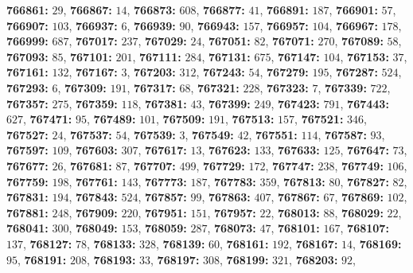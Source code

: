 \textsf{\bfseries 766861:} $29$, \textsf{\bfseries 766867:} $14$, \textsf{\bfseries 766873:} $608$, \textsf{\bfseries 766877:} $41$, \textsf{\bfseries 766891:} $187$, \textsf{\bfseries 766901:} $57$, \textsf{\bfseries 766907:} $103$, \textsf{\bfseries 766937:} $6$, \textsf{\bfseries 766939:} $90$, \textsf{\bfseries 766943:} $157$, \textsf{\bfseries 766957:} $104$, \textsf{\bfseries 766967:} $178$, \textsf{\bfseries 766999:} $687$, \textsf{\bfseries 767017:} $237$, \textsf{\bfseries 767029:} $24$, \textsf{\bfseries 767051:} $82$, \textsf{\bfseries 767071:} $270$, \textsf{\bfseries 767089:} $58$, \textsf{\bfseries 767093:} $85$, \textsf{\bfseries 767101:} $201$, \textsf{\bfseries 767111:} $284$, \textsf{\bfseries 767131:} $675$, \textsf{\bfseries 767147:} $104$, \textsf{\bfseries 767153:} $37$, \textsf{\bfseries 767161:} $132$, \textsf{\bfseries 767167:} $3$, \textsf{\bfseries 767203:} $312$, \textsf{\bfseries 767243:} $54$, \textsf{\bfseries 767279:} $195$, \textsf{\bfseries 767287:} $524$, \textsf{\bfseries 767293:} $6$, \textsf{\bfseries 767309:} $191$, \textsf{\bfseries 767317:} $68$, \textsf{\bfseries 767321:} $228$, \textsf{\bfseries 767323:} $7$, \textsf{\bfseries 767339:} $722$, \textsf{\bfseries 767357:} $275$, \textsf{\bfseries 767359:} $118$, \textsf{\bfseries 767381:} $43$, \textsf{\bfseries 767399:} $249$, \textsf{\bfseries 767423:} $791$, \textsf{\bfseries 767443:} $627$, \textsf{\bfseries 767471:} $95$, \textsf{\bfseries 767489:} $101$, \textsf{\bfseries 767509:} $191$, \textsf{\bfseries 767513:} $157$, \textsf{\bfseries 767521:} $346$, \textsf{\bfseries 767527:} $24$, \textsf{\bfseries 767537:} $54$, \textsf{\bfseries 767539:} $3$, \textsf{\bfseries 767549:} $42$, \textsf{\bfseries 767551:} $114$, \textsf{\bfseries 767587:} $93$, \textsf{\bfseries 767597:} $109$, \textsf{\bfseries 767603:} $307$, \textsf{\bfseries 767617:} $13$, \textsf{\bfseries 767623:} $133$, \textsf{\bfseries 767633:} $125$, \textsf{\bfseries 767647:} $73$, \textsf{\bfseries 767677:} $26$, \textsf{\bfseries 767681:} $87$, \textsf{\bfseries 767707:} $499$, \textsf{\bfseries 767729:} $172$, \textsf{\bfseries 767747:} $238$, \textsf{\bfseries 767749:} $106$, \textsf{\bfseries 767759:} $198$, \textsf{\bfseries 767761:} $143$, \textsf{\bfseries 767773:} $187$, \textsf{\bfseries 767783:} $359$, \textsf{\bfseries 767813:} $80$, \textsf{\bfseries 767827:} $82$, \textsf{\bfseries 767831:} $194$, \textsf{\bfseries 767843:} $524$, \textsf{\bfseries 767857:} $99$, \textsf{\bfseries 767863:} $407$, \textsf{\bfseries 767867:} $67$, \textsf{\bfseries 767869:} $102$, \textsf{\bfseries 767881:} $248$, \textsf{\bfseries 767909:} $220$, \textsf{\bfseries 767951:} $151$, \textsf{\bfseries 767957:} $22$, \textsf{\bfseries 768013:} $88$, \textsf{\bfseries 768029:} $22$, \textsf{\bfseries 768041:} $300$, \textsf{\bfseries 768049:} $153$, \textsf{\bfseries 768059:} $287$, \textsf{\bfseries 768073:} $47$, \textsf{\bfseries 768101:} $167$, \textsf{\bfseries 768107:} $137$, \textsf{\bfseries 768127:} $78$, \textsf{\bfseries 768133:} $328$, \textsf{\bfseries 768139:} $60$, \textsf{\bfseries 768161:} $192$, \textsf{\bfseries 768167:} $14$, \textsf{\bfseries 768169:} $95$, \textsf{\bfseries 768191:} $208$, \textsf{\bfseries 768193:} $33$, \textsf{\bfseries 768197:} $308$, \textsf{\bfseries 768199:} $321$, \textsf{\bfseries 768203:} $92$, 
